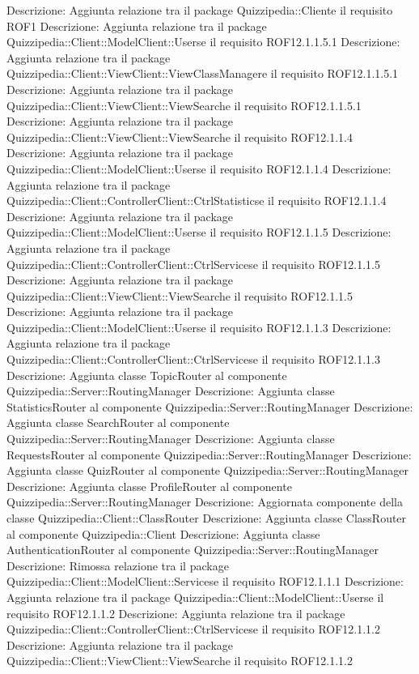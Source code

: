 Descrizione: Aggiunta relazione tra il package Quizzipedia::Cliente il requisito ROF1 
Descrizione: Aggiunta relazione tra il package Quizzipedia::Client::ModelClient::Userse il requisito ROF12.1.1.5.1 
Descrizione: Aggiunta relazione tra il package Quizzipedia::Client::ViewClient::ViewClassManagere il requisito ROF12.1.1.5.1 
Descrizione: Aggiunta relazione tra il package Quizzipedia::Client::ViewClient::ViewSearche il requisito ROF12.1.1.5.1 
Descrizione: Aggiunta relazione tra il package Quizzipedia::Client::ViewClient::ViewSearche il requisito ROF12.1.1.4 
Descrizione: Aggiunta relazione tra il package Quizzipedia::Client::ModelClient::Userse il requisito ROF12.1.1.4 
Descrizione: Aggiunta relazione tra il package Quizzipedia::Client::ControllerClient::CtrlStatisticse il requisito ROF12.1.1.4 
Descrizione: Aggiunta relazione tra il package Quizzipedia::Client::ModelClient::Userse il requisito ROF12.1.1.5 
Descrizione: Aggiunta relazione tra il package Quizzipedia::Client::ControllerClient::CtrlServicese il requisito ROF12.1.1.5 
Descrizione: Aggiunta relazione tra il package Quizzipedia::Client::ViewClient::ViewSearche il requisito ROF12.1.1.5 
Descrizione: Aggiunta relazione tra il package Quizzipedia::Client::ModelClient::Userse il requisito ROF12.1.1.3 
Descrizione: Aggiunta relazione tra il package Quizzipedia::Client::ControllerClient::CtrlServicese il requisito ROF12.1.1.3 
Descrizione: Aggiunta classe TopicRouter al componente Quizzipedia::Server::RoutingManager 
Descrizione: Aggiunta classe StatisticsRouter al componente Quizzipedia::Server::RoutingManager 
Descrizione: Aggiunta classe SearchRouter al componente Quizzipedia::Server::RoutingManager 
Descrizione: Aggiunta classe RequestsRouter al componente Quizzipedia::Server::RoutingManager 
Descrizione: Aggiunta classe QuizRouter al componente Quizzipedia::Server::RoutingManager 
Descrizione: Aggiunta classe ProfileRouter al componente Quizzipedia::Server::RoutingManager 
Descrizione: Aggiornata componente della classe Quizzipedia::Client::ClassRouter 
Descrizione: Aggiunta classe ClassRouter al componente Quizzipedia::Client 
Descrizione: Aggiunta classe AuthenticationRouter al componente Quizzipedia::Server::RoutingManager 
Descrizione: Rimossa relazione tra il package Quizzipedia::Client::ModelClient::Servicese il requisito ROF12.1.1.1 
Descrizione: Aggiunta relazione tra il package Quizzipedia::Client::ModelClient::Userse il requisito ROF12.1.1.2 
Descrizione: Aggiunta relazione tra il package Quizzipedia::Client::ControllerClient::CtrlServicese il requisito ROF12.1.1.2 
Descrizione: Aggiunta relazione tra il package Quizzipedia::Client::ViewClient::ViewSearche il requisito ROF12.1.1.2 
